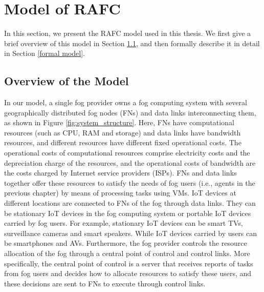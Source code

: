 \documentclass[11pt]{phdthesis}
\begin{document}
\section{Model of RAFC} \label{model of fog}

In this section, we present the RAFC model used in this thesis. We first give a brief overview of this model in Section \ref{overview of the model}, and then formally describe it in detail in Section \ref{formal model}. 


\subsection{Overview of the Model} \label{overview of the model}

In our model, a single fog provider owns a fog computing system with several geographically distributed fog nodes (FNs) and data links interconnecting them, as shown in Figure \ref{fig:system_structure}. Here, FNs have computational resources (such as CPU, RAM and storage) and data links have bandwidth resources, and different resources have different fixed operational costs. The operational costs of computational resources comprise electricity costs and the depreciation charge of the resources, and the operational costs of bandwidth are the costs charged by Internet service providers (ISPs). FNs and data links together offer these resources to satisfy the needs of fog users (i.e., agents in the previous chapter) by means of processing tasks using VMs. 
IoT devices at different locations are connected to FNs of the fog through data links. They can be stationary IoT devices in the fog computing system or portable IoT devices carried by fog users. For example, stationary IoT devices can be smart TVs, surveillance cameras and smart speakers. While IoT devices carried by users can be smartphones and AVs. Furthermore, the fog provider controls the resource allocation of the fog through a central point of control and control links. More specifically, the central point of control is a server that receives reports of tasks from fog users and decides how to allocate resources to satisfy these users, and these decisions are sent to FNs to execute through control links.
\end{document}

